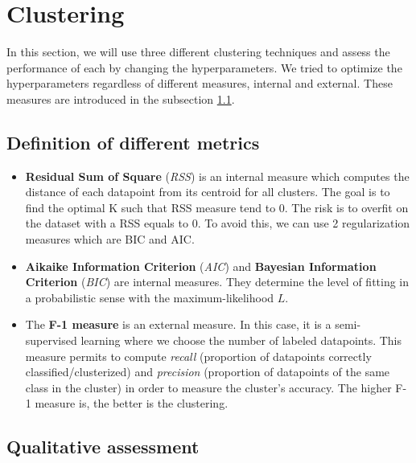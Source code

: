 \section{Clustering}
	In this section, we will use three different clustering techniques and assess the performance of each by changing the hyperparameters. We tried to optimize the hyperparameters regardless of different measures, internal and external. These measures are introduced in the subsection \ref{metrics}.
\subsection{Definition of different metrics}
\label{metrics}
\begin{itemize}
\item \textbf{Residual Sum of Square} (\textit{RSS}) is an internal measure which computes the distance of each datapoint from its centroid for all clusters. The goal is to find the optimal K such that RSS measure tend to 0. The risk is to overfit on the dataset with a RSS equals to 0. To avoid this, we can use 2 regularization measures which are BIC and AIC.
\item \textbf{Aikaike Information Criterion} (\textit{AIC}) and \textbf{Bayesian Information Criterion} (\textit{BIC}) are internal measures. They determine the level of fitting in a probabilistic sense with the maximum-likelihood $L$. 
\item The \textbf{F-1 measure} is an external measure. In this case, it is a semi-supervised learning where we choose the number of labeled datapoints. This measure permits to compute \emph{recall} (proportion of datapoints correctly classified/clusterized) and \emph{precision} (proportion of datapoints of the same class in the cluster) in order to measure the cluster's accuracy. The higher F-1 measure is, the better is the clustering. 
\end{itemize}

\subsection{Qualitative assessment}

